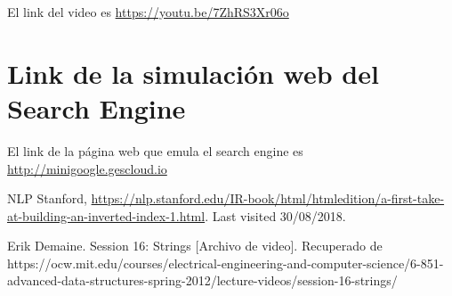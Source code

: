 \documentclass[a4paper]{article}
\begin{document}
El link del video es \url{https://youtu.be/7ZhRS3Xr06o}

\section{Link de la simulación web del Search Engine}

El link de la página web que emula el search engine es \url{http://minigoogle.gescloud.io}

\begin{thebibliography}{9}

NLP Stanford, \url{https://nlp.stanford.edu/IR-book/html/htmledition/a-first-take-at-building-an-inverted-index-1.html}. Last visited 30/08/2018.

Erik Demaine. Session 16: Strings [Archivo de video]. Recuperado de https://ocw.mit.edu/courses/electrical-engineering-and-computer-science/6-851-advanced-data-structures-spring-2012/lecture-videos/session-16-strings/
\end{thebibliography}
\end{document}
